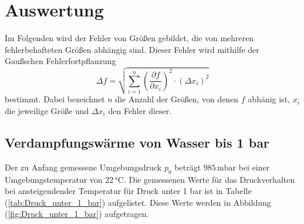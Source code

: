 \section{Auswertung}
\label{sec:Auswertung}
Im Folgenden wird der Fehler von Größen gebildet, die von mehreren fehlerbehafteten Größen abhängig sind. Dieser Fehler wird mithilfe der Gaußschen 
Fehlerfortpflanzung 
$$\Delta f = \sqrt{\sum_{i = 1}^{n} \left( \frac{\partial f}{\partial x_i} \right)^2 \cdot \left(\Delta x_i \right)^2}$$
bestimmt. Dabei bezeichnet $n$ die Anzahl der Größen, von denen $f$ abhänig ist, $x_i$ die jeweilige Größe und $\Delta x_i$ den Fehler dieser. \\

  \subsection{Verdampfungswärme von Wasser bis 1 bar}
   Der zu Anfang gemessene Umgebungsdruck $p_0$ beträgt $985\,\unit{\milli\bar}$ bei einer Umgebungstemperatur von $22 \,\unit{\celsius}$. 
  Die gemessenen Werte für das Druckverhalten bei ansteigendender Temperatur für 
  Druck unter 1 bar ist in Tabelle (\ref{tab:Druck_unter_1_bar}) aufgelistet. Diese Werte werden in Abbildung (\ref{fig:Druck_unter_1_bar}) aufgetragen.  


